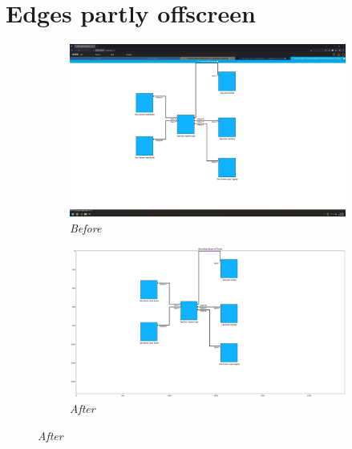 \documentclass{article}
\begin{document}
\section{Edges partly offscreen}
\begin{figure}[H]
    \centering
    \begin{subfigure}[t]{0.9\textwidth}
        \centering
        \includegraphics[width=\textwidth]{testcases/edge_offscreen_partly/152242-895612_input_image.png}
        \caption*{\textit{Before}}
    \end{subfigure}
    \newline    
    \begin{subfigure}[t]{0.9\textwidth}
        \centering
        \includegraphics[width=\textwidth]{testcases/edge_offscreen_partly/152255-292353_element_bbox_errors_labeled_colored.png}
        \caption*{\textit{After}}
    \end{subfigure}
    \label{fig:edges_partly_offscreen}
\end{figure}
\newpage
\end{document}
